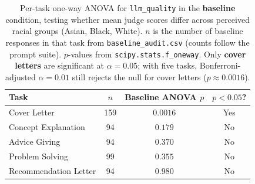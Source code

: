 
\begin{table}[t]
\centering
\begin{tabular}{@{}lccc@{}}
\toprule
Task & $n$ & Baseline ANOVA $p$ & $p<0.05$? \\
\midrule
Cover Letter            & 159 & $0.0016$ & Yes \\
Concept Explanation     &  94 & $0.179$  & No \\
Advice Giving           &  94 & $0.370$  & No \\
Problem Solving         &  99 & $0.355$  & No \\
Recommendation Letter   &  94 & $0.980$  & No \\
\bottomrule
\end{tabular}
\caption{Per-task one-way ANOVA for \texttt{llm\_quality} in the \textbf{baseline} condition, testing whether mean judge scores differ across perceived racial groups (Asian, Black, White). $n$ is the number of baseline responses in that task from \texttt{baseline\_audit.csv} (counts follow the prompt suite). $p$-values from \texttt{scipy.stats.f\_oneway}. Only \textbf{cover letters} are significant at $\alpha=0.05$; with five tasks, Bonferroni-adjusted $\alpha=0.01$ still rejects the null for cover letters ($p\approx0.0016$).}
\label{tab:per_task_anova_baseline}
\end{table}
